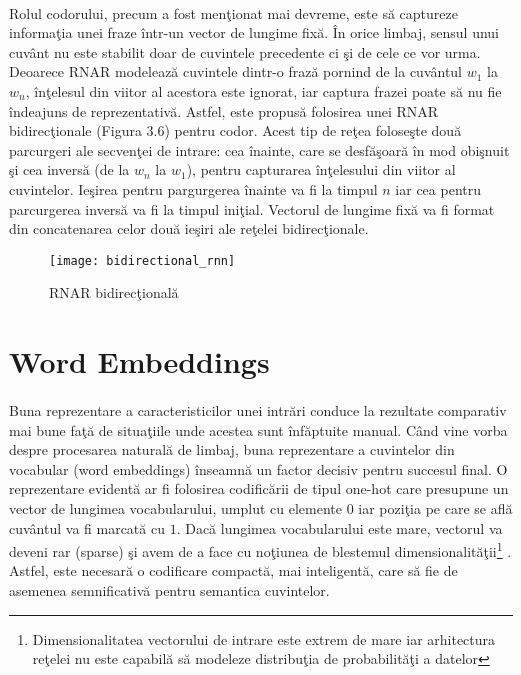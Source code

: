\paragraph{}
Rolul codorului, precum a fost men\c tionat mai devreme, este s\u a captureze informa\c tia unei fraze \^ intr-un vector de lungime fix\u a. \^ In orice limbaj, sensul unui cuv\^ ant nu este stabilit doar de cuvintele precedente ci \c si de cele ce vor urma. Deoarece RNAR modeleaz\u a cuvintele dintr-o fraz\u a pornind de la cuv\^ antul \(w_{1}\) la \(w_{n}\), \^ in\c telesul din viitor al acestora este ignorat, iar captura frazei poate s\u a nu fie \^ indeajuns de reprezentativ\u a. Astfel, este propus\u a folosirea unei RNAR bidirec\c tionale \cite{Schuster:1997:BRN:2198065.2205129} (Figura 3.6) pentru codor. Acest tip de re\c tea folose\c ste dou\u a parcurgeri ale secven\c tei de intrare: cea \^ inainte, care se desf\u a\c soar\u a \^ in mod obi\c snuit \c si cea invers\u a (de la \(w_{n}\) la \(w_{1}\)), pentru capturarea \^ in\c telesului din viitor al cuvintelor. Ie\c sirea pentru pargurgerea \^ inainte va fi la timpul \(n\) iar cea pentru parcurgerea invers\u a va fi la timpul ini\c tial. Vectorul de lungime fix\u a va fi format din concatenarea celor dou\u a ie\c siri ale re\c telei bidirec\c tionale.

\begin{figure}[H]
\centering
\texttt{[image: bidirectional\_rnn]}
\caption{RNAR bidirec\c tional\u a}
\end{figure} 

\section{Word Embeddings}

\paragraph{}
Buna reprezentare a caracteristicilor unei intr\u ari conduce la rezultate comparativ mai bune fa\c t\u a de situa\c tiile unde acestea sunt \^ inf\u aptuite manual. C\^ and vine vorba despre procesarea natural\u a de limbaj, buna reprezentare a cuvintelor din vocabular (word embeddings) \^ inseamn\u a un factor decisiv pentru succesul final. O reprezentare evident\u a ar fi folosirea codific\u arii de tipul one-hot care presupune un vector de lungimea vocabularului, umplut cu elemente \(0\) iar pozi\c tia pe care se afl\u a cuv\^ antul va fi marcat\u a cu \(1\). Dac\u a lungimea vocabularului este mare, vectorul va deveni rar (sparse) \c si avem de a face cu no\c tiunea de blestemul dimensionalit\u a\c tii\footnote{Dimensionalitatea vectorului de intrare este extrem de mare iar arhitectura re\c telei nu este capabil\u a s\u a modeleze distribu\c tia de probabilit\u a\c ti a datelor} \cite{doi:10.1093/imamat/24.1.59}. Astfel, este necesar\u a o codificare compact\u a, mai inteligent\u a, care s\u a fie de asemenea semnificativ\u a pentru semantica cuvintelor.

